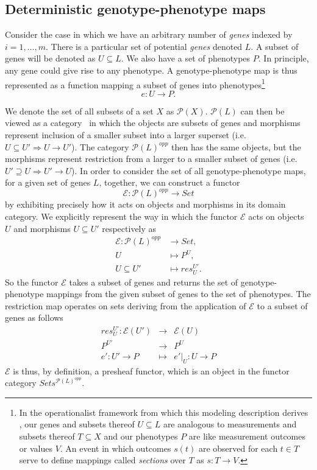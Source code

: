 \subsection{Deterministic genotype-phenotype maps}
Consider the case in which we have an arbitrary number of \emph{genes} indexed by $i=1, \ldots, m$. There is a particular set of potential \emph{genes} denoted $L$. A subset of genes will be denoted as $U \subseteq L$. We also have a set of phenotypes $P$. In principle, any gene could give rise to any phenotype. A genotype-phenotype map is thus represented as a function mapping a subset of genes into phenotypes\footnote{In the operationalist framework from which this modeling description derives \cite{Abramsky2011}, our genes and subsets thereof $U \subseteq L$ are analogous to measurements and subsets thereof $T \subseteq X$ and our phenotypes $P$ are like measurement outcomes or values $V$. An event in which outcomes $s(t)$ are observed for each $t \in T$ serve to define mappings called \emph{sections} over $T$ as $s \colon T \rightarrow V$.}
$$
e \colon U \rightarrow  P.
$$

We denote the set of all subsets of a set $X$ as $\mathcal{P}(X)$. $\mathcal{P}(L)$ can then be viewed as a category~\cite{Lane1998,MacLane1992,Awodey2006} in which the objects are subsets of genes and morphisms represent inclusion of a smaller subset into a larger superset (i.e. $U \subseteq U' \Rightarrow U \rightarrow U'$). The category $\mathcal{P}(L)^{opp}$ then has the same objects, but the morphisms represent restriction from a larger to a smaller subset of genes (i.e. $U' \supseteq U \Rightarrow U' \rightarrow U$). In order to consider the set of all genotype-phenotype maps, for a given set of genes $L$, together, we can construct a functor
$$
\mathcal{E} \colon \mathcal{P}(L)^{opp} \rightarrow Set
$$
by exhibiting precisely how it acts on objects and morphisms in its domain category. We explicitly represent the way in which the functor $\mathcal{E}$ acts on objects $U$ and morphisms $U \subseteq U'$ respectively as
\begin{equation}\label{eq:gpfunctor}
\begin{split}
\mathcal{E} \colon \mathcal{P}(L)^{opp} &\rightarrow Set,\\
U &\mapsto P^U,\\
U \subseteq U' &\mapsto res^{U'}_{U}.
\end{split}
\end{equation}
So the functor $\mathcal{E}$ takes a subset of genes and returns the set of genotype-phenotype mappings from the given subset of genes to the set of phenotypes. The restriction map operates on sets deriving from the application of $\mathcal{E}$ to a subset of genes as follows
\begin{eqnarray*}
res^{U'}_{U} \colon \mathcal{E}(U') &\rightarrow& \mathcal{E}(U)\\
P^{U'} &\rightarrow& P^U\\
e' \colon U' \rightarrow P &\mapsto& e'|_U \colon U \rightarrow P
\end{eqnarray*}
$\mathcal{E}$ is thus, by definition, a presheaf functor, which is an object in the functor category $Sets^{\mathcal{P}(L)^{opp}}$.

